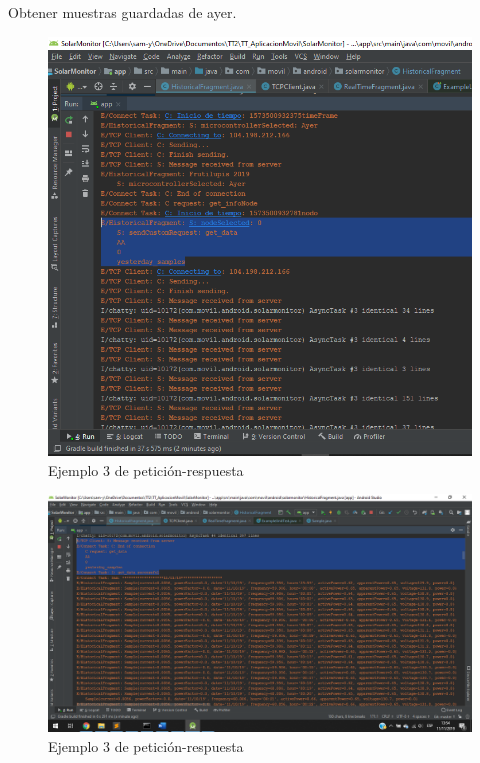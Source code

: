 Obtener muestras guardadas de ayer.
\begin{figure}[H]
	\centering
	\includegraphics[scale=.4]{Capitulo5/images/connect5.png}
	\caption{Ejemplo 3 de petición-respuesta}	\label{fig:connect5}
\end{figure} 

\begin{figure}[H]
	\centering
	\includegraphics[scale=.4]{Capitulo5/images/connect6.png}
	\caption{Ejemplo 3 de petición-respuesta}	\label{fig:connect6}
\end{figure} 


